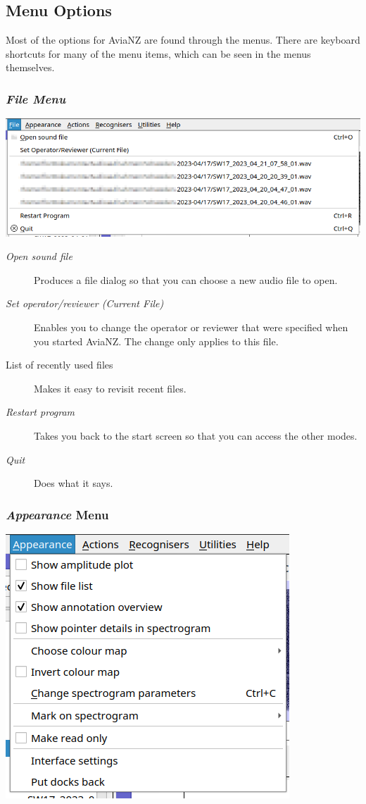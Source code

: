 \documentclass{scrartcl}
\begin{document}
\subsection{Menu Options}	

Most of the options for AviaNZ are found through the menus. There are keyboard shortcuts for many of the menu items, which can be seen in the menus themselves. 

\subsubsection{\textit{File Menu}}

\begin{center}
\includegraphics[width=.8\textwidth]{Figures/FileMenu}
\end{center}

\begin{description}
	\item[\textit{Open sound file}] Produces a file dialog so that you can choose a new audio file to open.
	\item[\textit{Set operator/reviewer (Current File)}] Enables you to change the operator or reviewer that were specified when you started AviaNZ. The change only applies to this file. 
\item[List of recently used files] Makes it easy to revisit recent files.
\item[\textit{Restart program}] Takes you back to the start screen so that you can access the other modes.
\item[\textit{Quit}] Does what it says.
\end{description}

\subsubsection{\textit{Appearance} Menu}

\begin{center}
\includegraphics[width=.5\textwidth]{Figures/AppearanceMenu}
\end{center}
\end{document}
